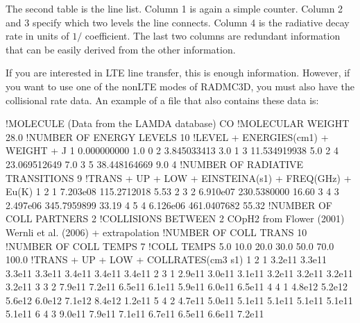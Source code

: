 \documentclass[letterpaper,10pt,english]{sphinxmanual}
\begin{document}
The second table is the line list. Column 1 is again a simple counter.  Column 2
and 3 specify which two levels the line connects. Column 4 is the radiative
decay rate in units of \(1/\)
coefficient. The last two columns are redundant information that can be easily
derived from the other information.

If you are interested in LTE line transfer, this is enough information.
However, if you want to use one of the non\sphinxhyphen{}LTE modes of RADMC\sphinxhyphen{}3D, you must
also have the collisional rate data. An example of a 
file that also contains these data is:

\begin{sphinxVerbatim}[commandchars=\\\{\}]
!MOLECULE (Data from the LAMDA database)
CO
!MOLECULAR WEIGHT
28.0
!NUMBER OF ENERGY LEVELS
10
!LEVEL + ENERGIES(cm\PYGZca{}\PYGZhy{}1) + WEIGHT + J
    1     0.000000000  1.0     0
    2     3.845033413  3.0     1
    3    11.534919938  5.0     2
    4    23.069512649  7.0     3
    5    38.448164669  9.0     4
!NUMBER OF RADIATIVE TRANSITIONS
9
!TRANS + UP + LOW + EINSTEINA(s\PYGZca{}\PYGZhy{}1) + FREQ(GHz) + E\PYGZus{}u(K)
    1     2     1   7.203e\PYGZhy{}08     115.2712018      5.53
    2     3     2   6.910e\PYGZhy{}07     230.5380000     16.60
    3     4     3   2.497e\PYGZhy{}06     345.7959899     33.19
    4     5     4   6.126e\PYGZhy{}06     461.0407682     55.32
!NUMBER OF COLL PARTNERS
2
!COLLISIONS BETWEEN
2 CO\PYGZhy{}pH2 from Flower (2001) \PYGZam{} Wernli et al. (2006) + extrapolation
!NUMBER OF COLL TRANS
10
!NUMBER OF COLL TEMPS
7
!COLL TEMPS
    5.0   10.0   20.0   30.0   50.0   70.0  100.0
!TRANS + UP + LOW + COLLRATES(cm\PYGZca{}3 s\PYGZca{}\PYGZhy{}1)
    1     2     1  3.2e\PYGZhy{}11 3.3e\PYGZhy{}11 3.3e\PYGZhy{}11 3.3e\PYGZhy{}11 3.4e\PYGZhy{}11 3.4e\PYGZhy{}11 3.4e\PYGZhy{}11
    2     3     1  2.9e\PYGZhy{}11 3.0e\PYGZhy{}11 3.1e\PYGZhy{}11 3.2e\PYGZhy{}11 3.2e\PYGZhy{}11 3.2e\PYGZhy{}11 3.2e\PYGZhy{}11
    3     3     2  7.9e\PYGZhy{}11 7.2e\PYGZhy{}11 6.5e\PYGZhy{}11 6.1e\PYGZhy{}11 5.9e\PYGZhy{}11 6.0e\PYGZhy{}11 6.5e\PYGZhy{}11
    4     4     1  4.8e\PYGZhy{}12 5.2e\PYGZhy{}12 5.6e\PYGZhy{}12 6.0e\PYGZhy{}12 7.1e\PYGZhy{}12 8.4e\PYGZhy{}12 1.2e\PYGZhy{}11
    5     4     2  4.7e\PYGZhy{}11 5.0e\PYGZhy{}11 5.1e\PYGZhy{}11 5.1e\PYGZhy{}11 5.1e\PYGZhy{}11 5.1e\PYGZhy{}11 5.1e\PYGZhy{}11
    6     4     3  9.0e\PYGZhy{}11 7.9e\PYGZhy{}11 7.1e\PYGZhy{}11 6.7e\PYGZhy{}11 6.5e\PYGZhy{}11 6.6e\PYGZhy{}11 7.2e\PYGZhy{}11

\end{sphinxVerbatim}
\end{document}
